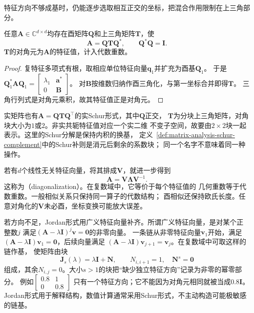 特征方向不够成基时，仍能逐步选取相互正交的坐标，把混合作用限制在上三角部分。
\begin{theorem}[复Schur分解]
任意$\bm A\in\mathbb C^{d\times d}$均存在酉矩阵$\bm Q$和上三角矩阵$\bm T$，使
\begin{equation}
 \bm A=\bm Q\bm T\bm Q^*,\qquad \bm Q^*\bm Q=\bm I.
 \label{eq:matrix-analysis-schur-decomposition}
\end{equation}
$\bm T$的对角元为$\bm A$的特征值，计入代数重数。
\end{theorem}
\begin{proof}
复特征多项式有根，取相应单位特征向量$\bm q_1$并扩充为酉基$\bm Q_1$。
于是$\bm Q_1^*\bm A\bm Q_1=
\left[\begin{smallmatrix}\lambda_1&\bm a^*\\0&\bm B\end{smallmatrix}\right]$。
对$\bm B$按维数归纳作酉三角化，与第一坐标合并即得$\bm T$。
三角行列式是对角元乘积，故其特征值正是对角元。
\end{proof}

实矩阵也有$\bm A=\bm Q\bm T\bm Q^\top$的实Schur形式，其中$\bm Q$正交，
$\bm T$为分块上三角矩阵，对角块大小为$1$或$2$。非实共轭特征值对应一个实二维
不变子空间，故要由$2\times2$块一起表示。这里的Schur分解是保持内积的换基，
定义~\ref{def:matrix-analysis-schur-complement}中的Schur补则是消元后剩余的系数块；
同一个名字不意味着同一种操作。

若有$d$个线性无关特征向量，将其排成$\bm V$，就进一步得到
\[
 \bm A=\bm V\bm\Lambda\bm V^{-1}.
\]
这称为（diagonalization）。在复数域中，它等价于每个特征值的
几何重数等于代数重数。一般相似关系只保持同一算子的代数结构；
酉相似还保持欧氏长度。任意对角化的$\bm V$未必酉，坐标变换可能放大误差。

若方向不足，Jordan形式用广义特征向量补齐。所谓广义特征向量，是对某个正整数$j$
满足$(\bm A-\lambda\bm I)^j\bm v=\bm0$的非零向量。
一条链从非零特征向量$\bm v_1$开始，满足
$(\bm A-\lambda\bm I)\bm v_1=\bm0$，后续向量满足
$(\bm A-\lambda\bm I)\bm v_{j+1}=\bm v_j$。在复数域中可取这样的链作基，
使矩阵由块
\[
 \bm J_s(\lambda)=\lambda\bm I+\bm N,\qquad
 N_{i,i+1}=1,\quad \bm N^s=\bm0
\]
组成，其余$N_{i,j}=0$。大小$s>1$的块把“缺少独立特征方向”记录为非零的幂零部分。
例如$\left[\begin{smallmatrix}0.8&1\\0&0.8\end{smallmatrix}\right]$
只有一个特征方向；它不能因为对角元相同就被当成$0.8\bm I$。
Jordan形式用于解释结构，数值计算通常采用Schur形式，不主动构造可能极敏感的链基。


